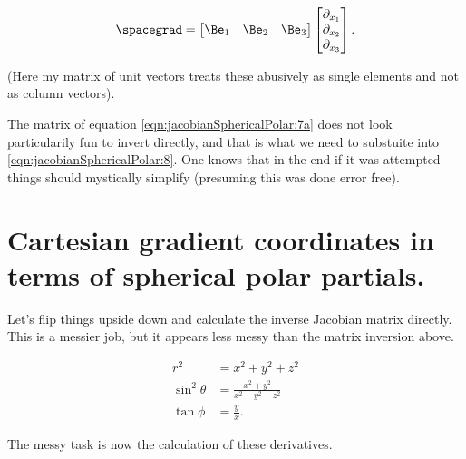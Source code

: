 \begin{align}\label{eqn:jacobianSphericalPolar:8}
\spacegrad = 
\begin{bmatrix}
\Be_1 & \Be_2 & \Be_3  
\end{bmatrix}
\begin{bmatrix}
\partial_{x_1} \\
\partial_{x_2} \\
\partial_{x_3}
\end{bmatrix}.
\end{align}

(Here my matrix of unit vectors treats these abusively as single elements and not as column vectors).

The matrix of equation \ref{eqn:jacobianSphericalPolar:7a} does not look particularily fun to invert directly, and that is what we need to substuite into
\ref{eqn:jacobianSphericalPolar:8}.  One knows that in the end if it was attempted things should mystically simplify (presuming this was done error free).

\section{Cartesian gradient coordinates in terms of spherical polar partials.}

Let's flip things upside down and calculate the inverse Jacobian matrix directly.  This is a messier job, but it appears less messy than the matrix inversion above.

\begin{subequations}\label{eqn:jacobianSphericalPolar:9}
\begin{align}
r^2 &= x^2 + y^2 + z^2  \\
\sin^2 \theta &= \frac{x^2 + y^2}{x^2 + y^2 + z^2} \\
\tan\phi &= \frac{y}{x}
.
\end{align}
\end{subequations}

The messy task is now the calculation of these derivatives.

\EndNoBibArticle
